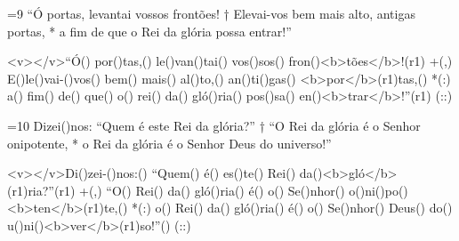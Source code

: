 =9 “Ó portas, levantai vossos frontões! †
Elevai-vos bem mais alto, antigas portas, *
a fim de que o Rei da glória possa entrar!”

<v></v>``Ó() por()tas,() le()van()tai() vos()sos() fron()<b>tões</b>!(r1) +(,)
E()le()vai-()vos() bem() mais() al()to,() an()ti()gas() <b>por</b>(r1)tas,() *(:)
a() fim() de() que() o() rei() da() gló()ria() pos()sa() en()<b>trar</b>!''(r1) (::)

=10 Dizei()nos: “Quem é este Rei da glória?” †
“O Rei da glória é o Senhor onipotente, *
o Rei da glória é o Senhor Deus do universo!”

<v></v>Di()zei-()nos:() ``Quem() é() es()te() Rei() da()<b>gló</b>(r1)ria?''(r1) +(,)
``O() Rei() da() gló()ria() é() o() Se()nhor() o()ni()po()<b>ten</b>(r1)te,() *(:)
o() Rei() da() gló()ria() é() o() Se()nhor() Deus() do() u()ni()<b>ver</b>(r1)so!''() (::)